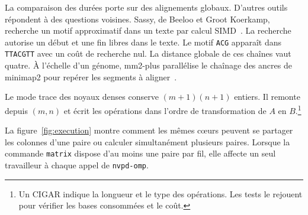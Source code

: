 La comparaison des durées porte sur des alignements globaux. D’autres outils répondent à des questions voisines. Sassy, de Beeloo et Groot Koerkamp, recherche un motif approximatif dans un texte par calcul SIMD~\cite{sassy}. La recherche autorise un début et une fin libres dans le texte. Le motif \texttt{ACG} apparaît dans \texttt{TTACGTT} avec un coût de recherche nul. La distance globale de ces chaînes vaut quatre. À l’échelle d’un génome, mm2-plus parallélise le chaînage des ancres de minimap2 pour repérer les segments à aligner~\cite{mm2plus}.

Le mode trace des noyaux denses conserve \((m+1)(n+1)\) entiers. Il remonte depuis \((m,n)\) et écrit les opérations dans l'ordre de transformation de \(A\) en \(B\).\footnote{Un CIGAR indique la longueur et le type des opérations. Les tests le rejouent pour vérifier les bases consommées et le coût.}

\FloatBarrier
La figure~\ref{fig:execution} montre comment les mêmes cœurs peuvent se partager les colonnes d’une paire ou calculer simultanément plusieurs paires. Lorsque la commande \texttt{matrix} dispose d’au moins une paire par fil, elle affecte un seul travailleur à chaque appel de \texttt{nvpd-omp}.


